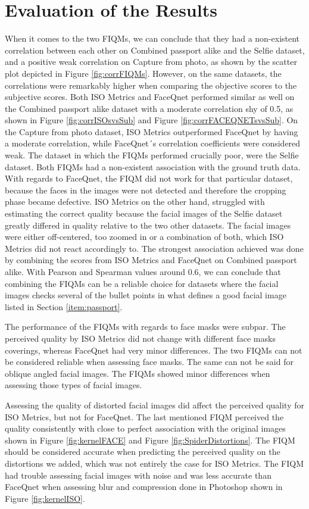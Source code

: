 \section{Evaluation of the Results}
\label{sec:resultsevaluation}
When it comes to the two FIQMs, we can conclude that they had a non-existent correlation between each other on Combined passport alike and the Selfie dataset, and a positive weak correlation on Capture from photo, as shown by the scatter plot depicted in Figure \ref{fig:corrFIQMs}. However, on the same datasets, the correlations were remarkably higher when comparing the objective scores to the subjective scores. Both ISO Metrics and FaceQnet performed similar as well on the Combined passport alike dataset with a moderate correlation shy of 0.5, as shown in Figure \ref{fig:corrISOsvsSub} and Figure \ref{fig:corrFACEQNETsvsSub}. On the Capture from photo dataset, ISO Metrics outperformed FaceQnet by having a moderate correlation, while FaceQnet´s correlation coefficients were considered weak. The dataset in which the FIQMs performed crucially poor, were the Selfie dataset. Both FIQMs had a non-existent association with the ground truth data. With regards to FaceQnet, the FIQM did not work for that particular dataset, because the faces in the images were not detected and therefore the cropping phase became defective. ISO Metrics on the other hand, struggled with estimating the correct quality because the facial images of the Selfie dataset greatly differed in quality relative to the two other datasets. The facial images were either off-centered, too zoomed in or a combination of both, which ISO Metrics did not react accordingly to. The strongest association achieved was done by combining the scores from ISO Metrics and FaceQnet on Combined passport alike. With Pearson and Spearman values around 0.6, we can conclude that combining the FIQMs can be a reliable choice for datasets where the facial images checks several of the bullet points in what defines a good facial image listed in Section \ref{item:passport}.

The performance of the FIQMs with regards to face masks were subpar. The perceived quality by ISO Metrics did not change with different face masks coverings, whereas FaceQnet had very minor differences. The two FIQMs can not be considered reliable when assessing face masks. The same can not be said for oblique angled facial images. The FIQMs showed minor differences when assessing those types of facial images. 

Assessing the quality of distorted facial images did affect the perceived quality for ISO Metrics, but not for FaceQnet. The last mentioned FIQM perceived the quality consistently with close to perfect association with the original images shown in Figure \ref{fig:kernelFACE} and Figure \ref{fig:SpiderDistortions}. The FIQM should be considered accurate when predicting the perceived quality on the distortions we added, which was not entirely the case for ISO Metrics. The FIQM had trouble assessing facial images with noise and was less accurate than FaceQnet when assessing blur and compression done in Photoshop shown in Figure \ref{fig:kernelISO}. 


